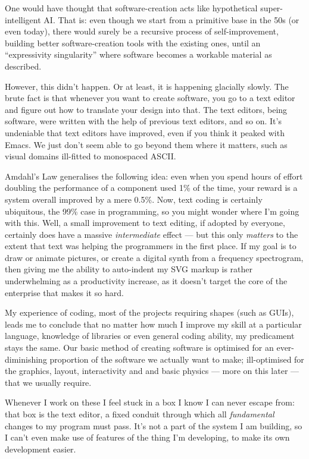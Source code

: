 One would have thought that software-creation acts like hypothetical
super-intelligent AI. That is: even though we start from a primitive
base in the 50s (or even today), there would surely be a recursive
process of self-improvement, building better software-creation tools
with the existing ones, until an ``expressivity singularity'' where
software becomes a workable material as described.

However, this didn't happen. Or at least, it is happening glacially
slowly. The brute fact is that whenever you want to create software, you
go to a text editor and figure out how to translate your design into
that. The text editors, being software, were written with the help of
previous text editors, and so on. It's undeniable that text editors have
improved, even if you think it peaked with Emacs. We just don't seem
able to go beyond them where it matters, such as visual domains
ill-fitted to monospaced ASCII.

Amdahl's Law generalises the following idea: even when you spend hours
of effort doubling the performance of a component used 1\% of the time,
your reward is a system overall improved by a mere 0.5\%. Now, text
coding is certainly ubiquitous, the 99\% case in programming, so you
might wonder where I'm going with this. Well, a small improvement to
text editing, if adopted by everyone, certainly does have a massive
\emph{intermediate} effect --- but this only \emph{matters} to the
extent that text was helping the programmers in the first place. If my
goal is to draw or animate pictures, or create a digital synth from a
frequency spectrogram, then giving me the ability to auto-indent my SVG
markup is rather underwhelming as a productivity increase, as it doesn't
target the core of the enterprise that makes it so hard.

My experience of coding, most of the projects requiring shapes (such as
GUIs), leads me to conclude that no matter how much I improve my skill
at a particular language, knowledge of libraries or even general coding
ability, my predicament stays the same. Our basic method of creating
software is optimised for an ever-diminishing proportion of the software
we actually want to make; ill-optimised for the graphics, layout,
interactivity and and basic physics --- more on this later --- that we
usually require.

Whenever I work on these I feel stuck in a box I know I can never escape
from: that box is the text editor, a fixed conduit through which all
\emph{fundamental} changes to my program must pass. It's not a part of
the system I am building, so I can't even make use of features of the
thing I'm developing, to make its own development easier.

